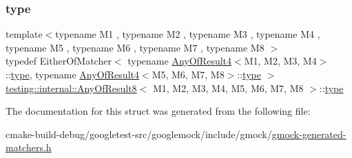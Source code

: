 \subsubsection{\texorpdfstring{type}{type}}
{\footnotesize\ttfamily template$<$typename M1 , typename M2 , typename M3 , typename M4 , typename M5 , typename M6 , typename M7 , typename M8 $>$ \\
typedef Either\+Of\+Matcher$<$ typename \mbox{\hyperlink{structtesting_1_1internal_1_1AnyOfResult4}{Any\+Of\+Result4}}$<$M1, M2, M3, M4$>$\+::\mbox{\hyperlink{structtesting_1_1internal_1_1AnyOfResult8_a8f8a1e78a019965c24bd22c78885747d}{type}}, typename \mbox{\hyperlink{structtesting_1_1internal_1_1AnyOfResult4}{Any\+Of\+Result4}}$<$M5, M6, M7, M8$>$\+::\mbox{\hyperlink{structtesting_1_1internal_1_1AnyOfResult8_a8f8a1e78a019965c24bd22c78885747d}{type}} $>$ \mbox{\hyperlink{structtesting_1_1internal_1_1AnyOfResult8}{testing\+::internal\+::\+Any\+Of\+Result8}}$<$ M1, M2, M3, M4, M5, M6, M7, M8 $>$\+::\mbox{\hyperlink{structtesting_1_1internal_1_1AnyOfResult8_a8f8a1e78a019965c24bd22c78885747d}{type}}}



The documentation for this struct was generated from the following file\+:\begin{DoxyCompactItemize}
\item 
cmake-\/build-\/debug/googletest-\/src/googlemock/include/gmock/\mbox{\hyperlink{gmock-generated-matchers_8h}{gmock-\/generated-\/matchers.\+h}}\end{DoxyCompactItemize}
